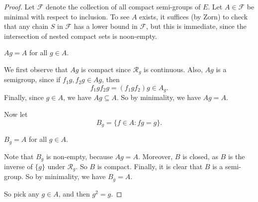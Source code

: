 \documentclass[a4paper]{article}
\begin{document}
\begin{proof}
  Let $\mathcal{F}$ denote the collection of all compact semi-groups of $E$. Let $A \in \mathcal{F}$ be minimal with respect to inclusion. To see $A$ exists, it suffices (by Zorn) to check that any chain $S$ in $\mathcal{F}$ has a lower bound in $\mathcal{F}$, but this is immediate, since the intersection of nested compact sets is noon-empty.

  \begin{claim}
    $Ag = A$ for all $g \in A$.
  \end{claim}
  We first observe that $Ag$ is compact since $\mathcal{R}_g$ is continuous. Also, $Ag$ is a semigroup, since if $f_1 g, f_2 g \in Ag$, then
  \[
    f_1 g f_2 g = (f_1 g f_2) g\in A_g.
  \]
  Finally, since $g \in A$, we have $Ag \subseteq A$. So by minimality, we have $Ag = A$.

  Now let
  \[
    B_g = \{f \in A: fg = g\}.
  \]
  \begin{claim}
    $B_g = A$ for all $g \in A$.
  \end{claim}
  Note that $B_g$ is non-empty, because $Ag = A$. Moreover, $B$ is closed, as $B$ is the inverse of $\{g\}$ under $\mathcal{R}_g$. So $B$ is compact. Finally, it is clear that $B$ is a semi-group. So by minimality, we have $B_g = A$.

  So pick any $g \in A$, and then $g^2 = g$.
\end{proof}
\end{document}
